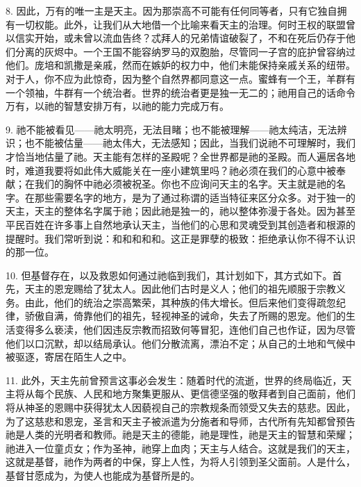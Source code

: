 8. 因此，万有的唯一主是天主。因为那崇高不可能有任何同等者，只有它独自拥有一切权能。此外，让我们从大地借一个比喻来看天主的治理。何时王权的联盟曾以信实开始，或未曾以流血告终？忒拜人的兄弟情谊破裂了，不和在死后仍存于他们分离的灰烬中。一个王国不能容纳罗马的双胞胎，尽管同一子宫的庇护曾容纳过他们。庞培和凯撒是亲戚，然而在嫉妒的权力中，他们未能保持亲戚关系的纽带。对于人，你不应为此惊奇，因为整个自然界都同意这一点。蜜蜂有一个王，羊群有一个领袖，牛群有一个统治者。世界的统治者更是独一无二的；祂用自己的话命令万有，以祂的智慧安排万有，以祂的能力完成万有。\par

9. 祂不能被看见——祂太明亮，无法目睹；也不能被理解——祂太纯洁，无法辨识；也不能被估量——祂太伟大，无法感知；因此，当我们说祂不可理解时，我们才恰当地估量了祂。天主能有怎样的圣殿呢？全世界都是祂的圣殿。而人遍居各地时，难道我要将如此伟大威能关在一座小建筑里吗？祂必须在我们的心意中被奉献；在我们的胸怀中祂必须被祝圣。你也不应询问天主的名字。天主就是祂的名字。在那些需要名字的地方，是为了通过称谓的适当特征来区分众多。对于独一的天主，天主的整体名字属于祂；因此祂是独一的，祂以整体弥漫于各处。因为甚至平民百姓在许多事上自然地承认天主，当他们的心思和灵魂受到其创造者和根源的提醒时。我们常听到说：和和和和和。这正是罪孽的极致：拒绝承认你不得不认识的那一位。\par

10. 但基督存在，以及救恩如何通过祂临到我们，其计划如下，其方式如下。首先，天主的恩宠赐给了犹太人。因此他们古时是义人；他们的祖先顺服于宗教义务。由此，他们的统治之崇高繁荣，其种族的伟大增长。但后来他们变得疏忽纪律，骄傲自满，倚靠他们的祖先，轻视神圣的诫命，失去了所赐的恩宠。他们的生活变得多么亵渎，他们因违反宗教而招致何等冒犯，连他们自己也作证，因为尽管他们以口沉默，却以结局承认。他们分散流离，漂泊不定；从自己的土地和气候中被驱逐，寄居在陌生人之中。\par

11. 此外，天主先前曾预言这事必会发生：随着时代的流逝，世界的终局临近，天主将从每个民族、人民和地方聚集更服从、更信德坚强的敬拜者到自己面前，他们将从神圣的恩赐中获得犹太人因藐视自己的宗教规条而领受又失去的慈悲。因此，为了这慈悲和恩宠，圣言和天主子被派遣为分施者和导师，古代所有先知都曾预告祂是人类的光明者和教师。祂是天主的德能，祂是理性，祂是天主的智慧和荣耀；祂进入一位童贞女；作为圣神，祂穿上血肉；天主与人结合。这就是我们的天主，这就是基督，祂作为两者的中保，穿上人性，为将人引领到圣父面前。人是什么，基督甘愿成为，为使人也能成为基督所是的。\par

